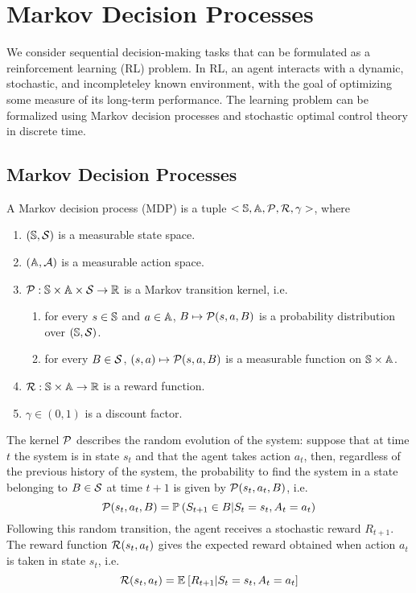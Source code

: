 \chapter{Markov Decision Processes}

We consider sequential decision-making tasks that can be formulated as a
reinforcement learning (RL) problem. In RL, an agent interacts with a dynamic,
stochastic, and incompleteley known environment, with the goal of optimizing
some measure of its long-term performance. The learning problem can be 
formalized using Markov decision processes and stochastic optimal control 
theory in discrete time.

\section{Markov Decision Processes}
\begin{definition}
	A Markov decision process (MDP) is a tuple $<\S, \A, \calP, \calR,
	\gamma>$, where
	\begin{enumerate}[label={\roman*)}]
		\item $(\S, \calS)$ is a measurable state space.
		\item $(\A, \calA)$ is a measurable action space. 
		\item $\calP: \S \times \A \times \calS \to \R$ is a Markov transition
			kernel, i.e.
			\begin{enumerate}[label={\alph*)}]
				\item for every $s\in\S$ and $a\in\A$, $B \mapsto \calP(s,a,B)$
					  is a probability distribution over $(\S, \calS)$.
				\item for every $B\in\calS$, $(s,a) \mapsto \calP(s,a,B)$ is
					  a measurable function on $\S \times \A$.
			\end{enumerate}
		\item $\calR: \S \times \A \to \R$ is a reward function.
		\item $\gamma \in (0,1)$ is a discount factor.
	\end{enumerate}
\end{definition}
The kernel $\calP$ describes the random evolution of the system: suppose that
at time $t$ the system is in state $s_t$ and that the agent takes action $a_t$,
then, regardless of the previous history of the system, the probability to find
the system in a state belonging to $B\in\calS$ at time $t+1$ is given by
$\calP(s_t, a_t, B)$, i.e.
\begin{equation}
	\calP(s_t, a_t, B) = \P{S_{t+1} \in B | S_t = s_t, A_t = a_t}
\end{equation}
Following this random transition, the agent receives a stochastic reward
$R_{t+1}$. The reward function $\calR(s_t, a_t)$ gives the expected reward
obtained when action $a_t$ is taken in state $s_t$, i.e. 
\begin{equation}
	\calR(s_t, a_t) = \E{R_{t+1} | S_t = s_t, A_t = a_t}
\end{equation}

